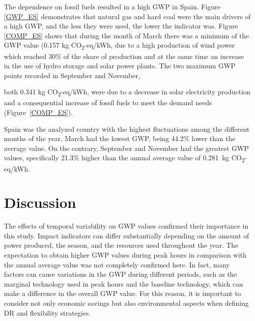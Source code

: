{{{The dependence on  fossil fuels resulted in a high GWP in Spain. Figure \ref{GWP_ES} demonstrates that natural gas and hard coal were the main drivers of a high GWP, and the less they were used, the lower the indicator was. Figure \ref{COMP_ES} shows that during the month of March there was a minimum of the GWP value {(0.157 kg CO\textsubscript2-eq/kWh}, due to a high production of wind power which reached 30\% of the share of production and at the same time an increase in the use of hydro storage and solar power plants. The two maximum GWP points recorded in September and November, {both  0.341 kg CO\textsubscript2-eq/kWh, were due to a decrease in solar electricity production and a consequential increase of fossil fuels to meet the demand needs (Figure~\ref{COMP_ES}). {Spain was the analyzed country with the highest fluctuations among the different months of the year. March had the lowest GWP, being 44.2\% lower than the average value. On the contrary, September and November had the greatest GWP values, specifically 21.3\% higher than the annual average value of 0.281~kg CO\textsubscript2-eq/kWh.


\section{Discussion} \label{Discussion}

The effects of temporal variability on GWP values confirmed their importance in this study. Impact indicators can differ substantially depending on the amount of power produced, the season, and the resources used throughout the year. The expectation to obtain higher GWP values during peak hours in comparison with the annual average value was not completely confirmed here. In fact, many factors can cause variations in the GWP during different periods, such as the marginal technology used in peak hours and the baseline technology, which can make a difference in the overall GWP value. {For this reason, it is important to consider not only economic savings but also environmental aspects when defining DR and flexibility strategies.}



}}}}}
